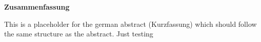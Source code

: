 \thispagestyle{empty}
\vspace*{0.2cm}

\begin{center}
    \textbf{Zusammenfassung} \label{zusammenfassung}
\end{center}

\vspace*{0.2cm}

\noindent 
This is a placeholder for the german abstract (Kurzfassung) which should follow the same structure as the abstract.
Just testing